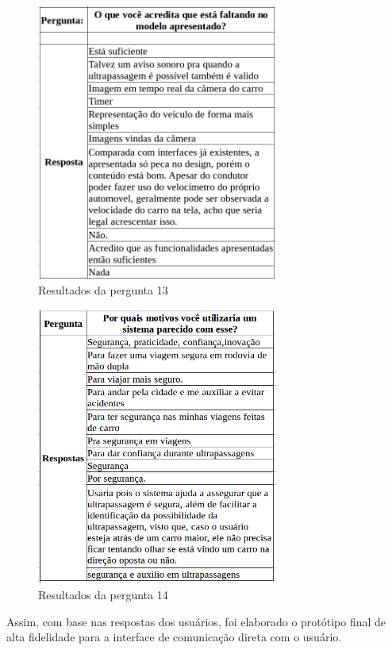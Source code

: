 \begin{figure}[!h]
  \centering
  \includegraphics[width=300px, scale=1]{figuras/quadro1}
  \caption{Resultados da pergunta 13}
\label{fig:quadro1}
\end{figure}			

\begin{figure}[!h]
  \centering
  \includegraphics[width=300px, scale=1]{figuras/quadro2}
  \caption{Resultados da pergunta 14}
\label{fig:quadro2}
\end{figure}	

Assim, com base nas respostas dos usuários, foi elaborado o protótipo final de alta fidelidade para a interface de comunicação direta com o usuário.

